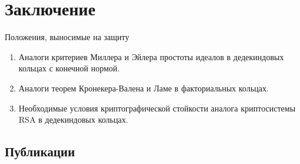\documentclass[8pt, xcolor=x11names]{beamer}
\begin{document}
\section{Заключение}

\begin{frame}
    \begin{block}{Положения, выносимые на защиту}
        \begin{enumerate}
            \item Аналоги критериев Миллера и Эйлера простоты идеалов в дедекиндовых кольцах с конечной нормой.
            
            \item Аналоги теорем Кронекера-Валена и Ламе в факториальных кольцах.
            
            \item Необходимые условия криптографической стойкости аналога криптосистемы RSA в дедекиндовых кольцах.
        \end{enumerate}
    \end{block}
\end{frame}

\subsection{Публикации}
\end{document}
